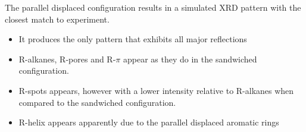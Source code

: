 \documentclass{article}
\begin{document}
  

  The parallel displaced configuration results in a simulated XRD pattern with
  the closest match to experiment.
  \begin{itemize}
        \item It produces the only pattern that exhibits all major reflections
        \item R-alkanes, R-pores and R-$\pi$ appear as they do in the sandwiched configuration.
        \item R-spots appears, however with a lower intensity relative to R-alkanes
        when compared to the sandwiched configuration.
        \item R-helix appears apparently due to the parallel displaced aromatic rings
  \end{itemize}
\end{document}
